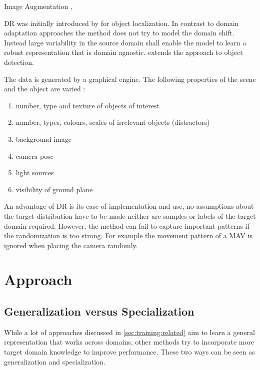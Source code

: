 \cite{Vass}

Image Augmentation
\cite{Bai2017},

\ac{DR} was initially introduced by \cite{Tobin2017} for object localization. In contrast to domain adaptation approaches the method does not try to model the domain shift. Instead large variability in the source domain shall enable the model to learn a robust representation that is domain agnostic. \cite{Tremblay2018a} extends the approach to object detection.

The data is generated by a graphical engine. The following properties of the scene and the object are varied \cite{Tremblay2018a}:

\begin{enumerate}
	\item number, type and texture of objects of interest
	\item number, types, colours, scales of irrelevant objects (distractors)
	\item background image
	\item camera pose
	\item light sources
	\item visibility of ground plane
\end{enumerate}

An advantage of \ac{DR} is its ease of implementation and use, no assumptions about the target distribution have to be made neither are samples or labels of the target domain required. However, the method can fail to capture important patterns if the randomization is too strong. For example the movement pattern of a \ac{MAV} is ignored when placing the camera randomly.
 
\section{Approach}
\label{sec:training:hypothesis}

\subsection{Generalization versus Specialization}

While a lot of approaches discussed in \autoref{sec:training:related} aim to learn a general representation that works across domains, other methods try to incorporate more target domain knowledge to improve performance. These two ways can be seen as generalization and specialization.  


